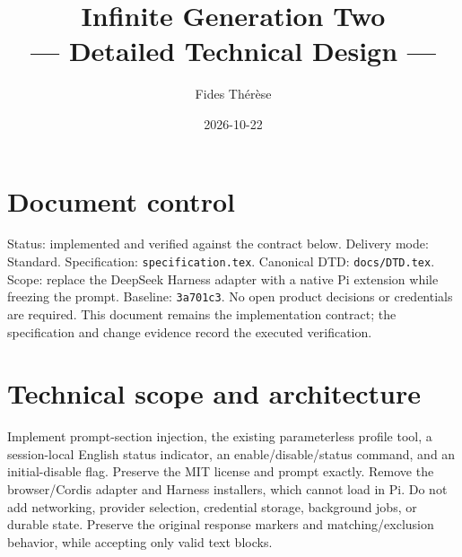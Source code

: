 \documentclass[10pt]{ltjsarticle}
\begin{document}
\title{Infinite Generation Two\\\large{--- Detailed Technical Design ---}}
\author{Fides Thérèse}
\date{2026-10-22}
\maketitle
\thispagestyle{plain}

\section{Document control}
Status: implemented and verified against the contract below. Delivery mode: Standard. Specification:
\texttt{specification.tex}. Canonical DTD: \texttt{docs/DTD.tex}. Scope: replace
the DeepSeek Harness adapter with a native Pi extension while freezing the
prompt. Baseline: \texttt{3a701c3}. No open product decisions or credentials
are required. This document remains the implementation contract; the
specification and change evidence record the executed verification.

\section{Technical scope and architecture}
Implement prompt-section injection, the existing parameterless profile tool,
a session-local English status indicator, an enable/disable/status command,
and an initial-disable flag. Preserve the MIT license and prompt exactly.
Remove the browser/Cordis adapter and Harness installers, which cannot load
in Pi. Do not add networking, provider selection, credential storage,
background jobs, or durable state. Preserve the original response markers and
matching/exclusion behavior, while accepting only valid text blocks.
\end{document}
